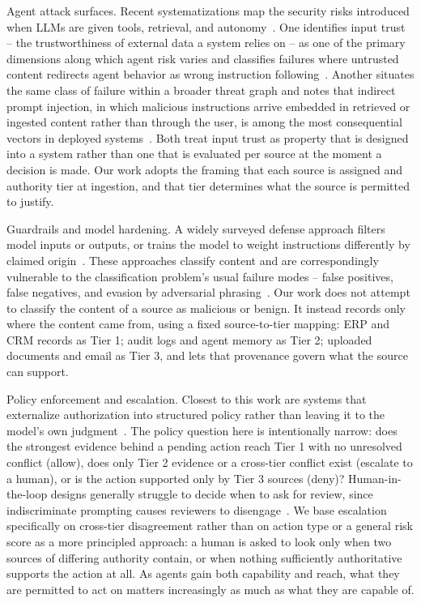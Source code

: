 \documentclass[conference]{IEEEtran}
\begin{document}
Agent attack surfaces. Recent systematizations map the security risks introduced when LLMs are given tools, retrieval, and autonomy~\cite{chhabra2026agentic,kim2026sok,dehghantanha2026sok}. One identifies input trust – the trustworthiness of external data a system relies on – as one of the primary dimensions along which agent risk varies and classifies failures where untrusted content redirects agent behavior as wrong instruction following~\cite{kim2026sok}. Another situates the same class of failure within a broader threat graph and notes that indirect prompt injection, in which malicious instructions arrive embedded in retrieved or ingested content rather than through the user, is among the most consequential vectors in deployed systems~\cite{dehghantanha2026sok}. Both treat input trust as property that is designed into a system rather than one that is evaluated per source at the moment a decision is made. Our work adopts the framing that each source is assigned and authority tier at ingestion, and that tier determines what the source is permitted to justify. 

Guardrails and model hardening. A widely surveyed defense approach filters model inputs or outputs, or trains the model to weight instructions differently by claimed origin~\cite{kim2026sok}. These approaches classify content and are correspondingly vulnerable to the classification problem’s usual failure modes – false positives, false negatives, and evasion by adversarial phrasing~\cite{kim2026sok}. Our work does not attempt to classify the content of a source as malicious or benign. It instead records only where the content came from, using a fixed source-to-tier mapping: ERP and CRM records as Tier 1; audit logs and agent memory as Tier 2; uploaded documents and email as Tier 3, and lets that provenance govern what the source can support. 

Policy enforcement and escalation. Closest to this work are systems that externalize authorization into structured policy rather than leaving it to the model’s own judgment~\cite{kim2026sok}. The policy question here is intentionally narrow: does the strongest evidence behind a pending action reach Tier 1 with no unresolved conflict (allow), does only Tier 2 evidence or a cross-tier conflict exist (escalate to a human), or is the action supported only by Tier 3 sources (deny)? Human-in-the-loop designs generally struggle to decide when to ask for review, since indiscriminate prompting causes reviewers to disengage~\cite{kim2026sok}. We base escalation specifically on cross-tier disagreement rather than on action type or a general risk score as a more principled approach: a human is asked to look only when two sources of differing authority contain, or when nothing sufficiently authoritative supports the action at all. As agents gain both capability and reach, what they are permitted to act on matters increasingly as much as what they are capable of.
\end{document}
